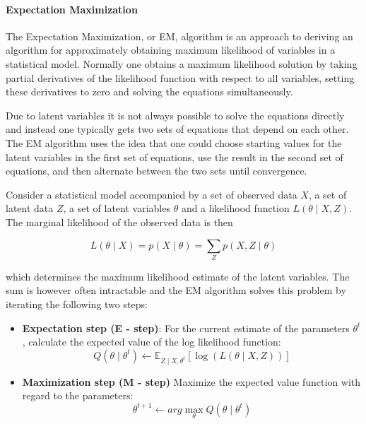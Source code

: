 \documentclass[12pt]{report}
\begin{document}
\paragraph{Expectation Maximization}

The Expectation Maximization, or EM, algorithm is an approach to deriving an
algorithm for approximately obtaining maximum likelihood of variables in a
statistical model. Normally one obtains a maximum likelihood solution by taking
partial derivatives of the likelihood function with respect to all variables,
setting these derivatives to zero and solving the equations simultaneously.

Due to latent variables it is not always possible to solve the equations
directly and instead one typically gets two sets of equations that depend on
each other. The EM algorithm uses the idea that one could choose starting
values for the latent variables in the first set of equations, use the result
in the second set of equations, and then alternate between the two sets until
convergence.

Consider a statistical model accompanied by a set of observed data $X$, a set of
latent data $Z$, a set of latent variables $\theta$ and a likelihood function
$L(\theta \mid X, Z)$. The marginal likelihood of the observed data is then

\begin{equation}
L(\theta \mid X) = p(X \mid \theta) = \sum\limits_{Z} p(X, Z \mid \theta)
\end{equation}

which determines the maximum likelihood estimate of the latent variables. The
sum is however often intractable and the EM algorithm solves this problem by
iterating the following two steps:

\begin{itemize}
\item \textbf{Expectation step (E - step)}: For the current estimate of the 
parameters $\theta^t$, calculate the expected value of the log likelihood function:
\begin{equation}
Q(\theta \mid \theta^t) \leftarrow \mathbb{E}_{Z \mid X, \theta^t}
 [\log(L(\theta \mid X, Z))]
\end{equation}
\item \textbf{Maximization step (M - step)} Maximize the expected value function 
with regard to the parameters:
\begin{equation}
\theta^{t + 1} \leftarrow arg \max\limits_{\theta} Q(\theta \mid \theta^t)
\end{equation}
\end{itemize}
\end{document}
